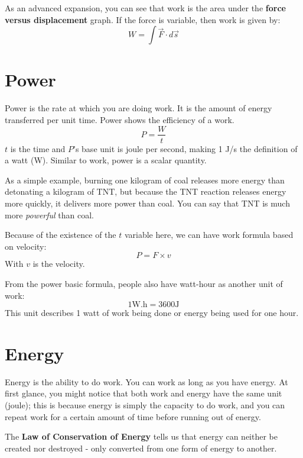 As an advanced expansion, you can see that work is the area under the \textbf{force versus displacement} graph. If the force is variable, then work is given by:
\begin{equation}
    W = \int \vec{F} \cdot d\vec{s}
\end{equation}

\section{Power}
Power is the rate at which you are doing work. It is the amount of energy transferred per unit time. Power shows the efficiency of a work.
\begin{equation}
    P = \frac{W}{t}
\end{equation}
$t$ is the time and $P$'s base unit is joule per second, making 1 J/s the definition of a watt (W). Similar to work, power is a scalar quantity.

As a simple example, burning one kilogram of coal releases more energy than detonating a kilogram of TNT, but because the TNT reaction releases energy more quickly, it delivers more power than coal. You can say that TNT is much more \textit{powerful} than coal.

Because of the existence of the $t$ variable here, we can have work formula based on velocity:
\begin{equation}
    P = F \times v
\end{equation}
With $v$ is the velocity.

From the power basic formula, people also have watt-hour as another unit of work:
\begin{equation}
    1 \text{W.h} = 3600 \text{J}
\end{equation}
This unit describes 1 watt of work being done or energy being used for one hour.

\section{Energy}
Energy is the ability to do work. You can work as long as you have energy. At first glance, you might notice that both work and energy have the same unit (joule); this is because energy is simply the capacity to do work, and you can repeat work for a certain amount of time before running out of energy.

The \textbf{Law of Conservation of Energy} tells us that energy can neither be created nor destroyed - only converted from one form of energy to another.

